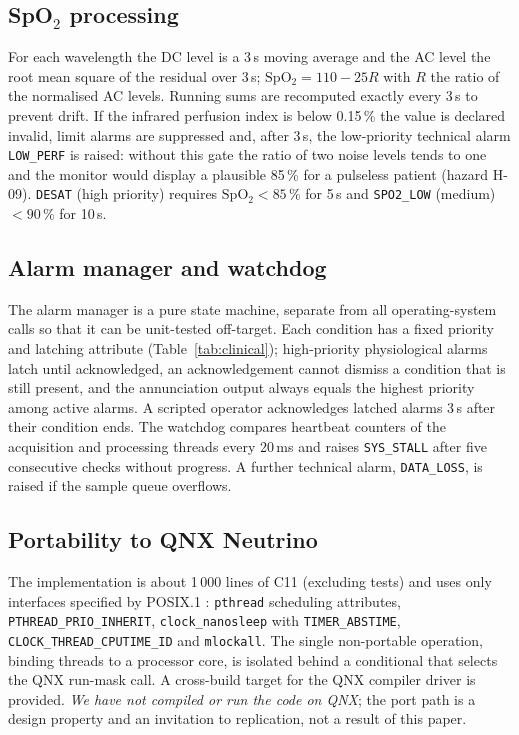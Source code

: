 \documentclass[preprint,3p,10pt]{elsarticle}
\begin{document}
\subsection{SpO$_2$ processing}
For each wavelength the DC level is a 3\,s moving average and the AC level the root mean square of the residual over 3\,s; $\mathrm{SpO_2}=110-25R$ with $R$ the ratio of the normalised AC levels. Running sums are recomputed exactly every 3\,s to prevent drift. If the infrared perfusion index is below 0.15\,\% the value is declared invalid, limit alarms are suppressed and, after 3\,s, the low-priority technical alarm \texttt{LOW\_PERF} is raised: without this gate the ratio of two noise levels tends to one and the monitor would display a plausible 85\,\% for a pulseless patient (hazard H-09). \texttt{DESAT} (high priority) requires $\mathrm{SpO_2}<85$\,\% for 5\,s and \texttt{SPO2\_LOW} (medium) $<90$\,\% for 10\,s.

\subsection{Alarm manager and watchdog}
The alarm manager is a pure state machine, separate from all operating-system calls so that it can be unit-tested off-target. Each condition has a fixed priority and latching attribute (Table~\ref{tab:clinical}); high-priority physiological alarms latch until acknowledged, an acknowledgement cannot dismiss a condition that is still present, and the annunciation output always equals the highest priority among active alarms. A scripted operator acknowledges latched alarms 3\,s after their condition ends. The watchdog compares heartbeat counters of the acquisition and processing threads every 20\,ms and raises \texttt{SYS\_STALL} after five consecutive checks without progress. A further technical alarm, \texttt{DATA\_LOSS}, is raised if the sample queue overflows.

\subsection{Portability to QNX Neutrino}
The implementation is about 1\,000 lines of C11 (excluding tests) and uses only interfaces specified by POSIX.1 \cite{posix2017}: \texttt{pthread} scheduling attributes, \texttt{PTHREAD\_PRIO\_INHERIT}, \texttt{clock\_nanosleep} with \texttt{TIMER\_ABSTIME}, \texttt{CLOCK\_THREAD\_CPUTIME\_ID} and \texttt{mlockall}. The single non-portable operation, binding threads to a processor core, is isolated behind a conditional that selects the QNX run-mask call. A cross-build target for the QNX compiler driver is provided. \emph{We have not compiled or run the code on QNX}; the port path is a design property and an invitation to replication, not a result of this paper.
\end{document}
